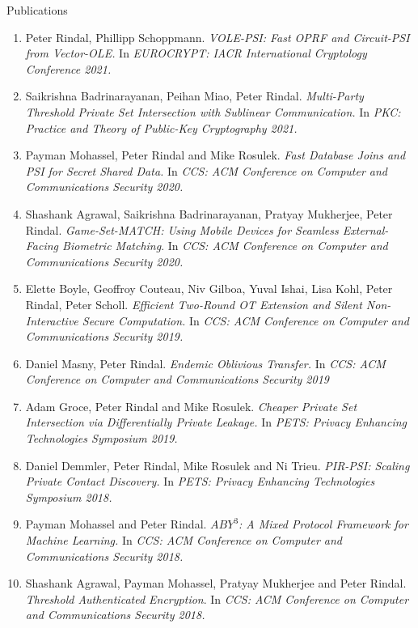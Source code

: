 \documentclass{resume} %
\begin{document}
\begin{rSection}{Publications}
\begin{enumerate}[label=C\arabic* --]
	
	\item Peter Rindal,  Phillipp Schoppmann. \emph{VOLE-PSI: Fast OPRF and Circuit-PSI from Vector-OLE.} In \emph{EUROCRYPT: IACR International Cryptology Conference 2021.}
	
	\item Saikrishna Badrinarayanan, Peihan Miao, Peter Rindal. \emph{Multi-Party Threshold Private Set Intersection with Sublinear Communication.} In \emph{PKC: Practice and Theory of Public-Key Cryptography 2021.}
	
	\item Payman Mohassel, Peter Rindal and Mike Rosulek. \emph{Fast Database Joins and PSI for Secret Shared Data.} In \emph{CCS: ACM Conference on Computer and Communications Security 2020.}
	
	\item Shashank Agrawal, Saikrishna Badrinarayanan, Pratyay Mukherjee, Peter Rindal.
	\emph{Game-Set-MATCH: Using Mobile Devices for Seamless External-Facing Biometric Matching}. In \emph{CCS: ACM Conference on Computer and Communications Security  2020.}
	
	\item Elette Boyle, Geoffroy Couteau, Niv Gilboa, Yuval Ishai, Lisa Kohl, Peter Rindal, Peter Scholl.
	\emph{Efficient Two-Round OT Extension and Silent Non-Interactive Secure Computation.} In \emph{CCS: ACM Conference on Computer and Communications Security   2019.}
	
	\item Daniel Masny, Peter Rindal. \emph{Endemic Oblivious Transfer.} In \emph{CCS: ACM Conference on Computer and Communications Security 2019}
	
	\item Adam Groce, Peter Rindal and Mike Rosulek. \emph{Cheaper Private Set Intersection  via Differentially Private Leakage.}  In \emph{PETS: Privacy Enhancing Technologies Symposium 2019.}
	
	\item Daniel Demmler, Peter Rindal, Mike Rosulek and Ni Trieu. \emph{PIR-PSI: Scaling Private Contact Discovery.}  In \emph{PETS: Privacy Enhancing Technologies Symposium 2018.}
	
	\item Payman Mohassel and Peter Rindal. \emph{$ABY^3$: A Mixed Protocol Framework for Machine Learning.} In \emph{CCS: ACM Conference on Computer and Communications Security 2018.}
	
	\item Shashank Agrawal, Payman Mohassel, Pratyay Mukherjee and Peter Rindal. \emph{Threshold Authenticated Encryption}. In \emph{CCS: ACM Conference on Computer and Communications Security 2018.}	
	

\end{enumerate}
\end{rSection}
\end{document}
